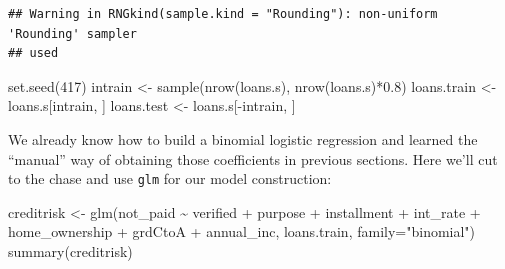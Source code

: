 \documentclass[
]{article}
\newenvironment{Shaded}{\begin{snugshade}}{\end{snugshade}}
\newcommand{\AttributeTok}[1]{\textcolor[rgb]{0.77,0.63,0.00}{#1}}
\newcommand{\DecValTok}[1]{\textcolor[rgb]{0.00,0.00,0.81}{#1}}
\newcommand{\FloatTok}[1]{\textcolor[rgb]{0.00,0.00,0.81}{#1}}
\newcommand{\FunctionTok}[1]{\textcolor[rgb]{0.00,0.00,0.00}{#1}}
\newcommand{\NormalTok}[1]{#1}
\newcommand{\OtherTok}[1]{\textcolor[rgb]{0.56,0.35,0.01}{#1}}
\newcommand{\SpecialCharTok}[1]{\textcolor[rgb]{0.00,0.00,0.00}{#1}}
\newcommand{\StringTok}[1]{\textcolor[rgb]{0.31,0.60,0.02}{#1}}
\begin{document}
\begin{verbatim}
## Warning in RNGkind(sample.kind = "Rounding"): non-uniform 'Rounding' sampler
## used
\end{verbatim}

\begin{Shaded}
\begin{Highlighting}[]
\FunctionTok{set.seed}\NormalTok{(}\DecValTok{417}\NormalTok{)}
\NormalTok{intrain }\OtherTok{\textless{}{-}} \FunctionTok{sample}\NormalTok{(}\FunctionTok{nrow}\NormalTok{(loans.s), }\FunctionTok{nrow}\NormalTok{(loans.s)}\SpecialCharTok{*}\FloatTok{0.8}\NormalTok{)}
\NormalTok{loans.train }\OtherTok{\textless{}{-}}\NormalTok{ loans.s[intrain, ]}
\NormalTok{loans.test }\OtherTok{\textless{}{-}}\NormalTok{ loans.s[}\SpecialCharTok{{-}}\NormalTok{intrain, ]}
\end{Highlighting}
\end{Shaded}

We already know how to build a binomial logistic regression and learned
the ``manual'' way of obtaining those coefficients in previous sections.
Here we'll cut to the chase and use \texttt{glm} for our model
construction:

\begin{Shaded}
\begin{Highlighting}[]
\NormalTok{creditrisk }\OtherTok{\textless{}{-}} \FunctionTok{glm}\NormalTok{(not\_paid }\SpecialCharTok{\textasciitilde{}}\NormalTok{ verified }\SpecialCharTok{+}\NormalTok{ purpose }\SpecialCharTok{+}\NormalTok{ installment }\SpecialCharTok{+}\NormalTok{ int\_rate }\SpecialCharTok{+}\NormalTok{ home\_ownership }\SpecialCharTok{+}\NormalTok{ grdCtoA }\SpecialCharTok{+}\NormalTok{ annual\_inc, loans.train, }\AttributeTok{family=}\StringTok{"binomial"}\NormalTok{)}
\FunctionTok{summary}\NormalTok{(creditrisk)}
\end{Highlighting}
\end{Shaded}
\end{document}
